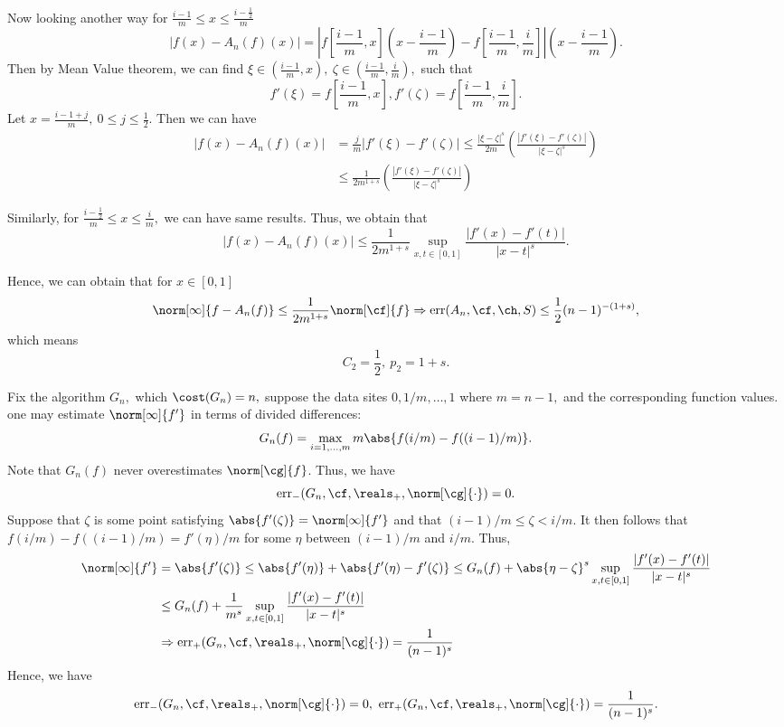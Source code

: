 Now looking another way for $\frac{i-1}{m} \leq x \leq \frac{i-\frac{1}{2}}{m}$
$$\left|f(x)-A_{n}(f)(x)\right|=\left|f\left[\frac{i-1}{m},x\right]\left(x-\frac{i-1}{m}\right)-f\left[\frac{i-1}{m},\frac{i}{m}\right]\right|\left(x-\frac{i-1}{m}\right).$$
Then by Mean Value theorem, we can find $\xi \in \left(\frac{i-1}{m},x\right), \ \zeta \in \left(\frac{i-1}{m},\frac{i}{m}\right),$ such that
$$f'(\xi)=f\left[\frac{i-1}{m},x\right],f'(\zeta)=f\left[\frac{i-1}{m},\frac{i}{m}\right].$$
Let $x=\frac{i-1+j}{m}, \ 0 \leq j \leq \frac{1}{2}.$ Then we can have
\begin{align*}
\left|f(x)-A_{n}(f)(x)\right|&=\frac{j}{m}|f'(\xi)-f'(\zeta)| \leq \frac{|\xi-\zeta|^{s}}{2m}\left(\frac{|f'(\xi)-f'(\zeta)|}{|\xi-\zeta|^{s}}\right)  \\
 & \leq \frac{1}{2m^{1+s}}\left(\frac{|f'(\xi)-f'(\zeta)|}{|\xi-\zeta|^{s}}\right)
\end{align*}

Similarly, for $\frac{i-\frac{1}{2}}{m} \leq x \leq \frac{i}{m},$ we can have same results.
Thus, we obtain that
$$\left|f(x)-A_{n}(f)(x)\right|\leq \frac{1}{2m^{1+s}}\sup\limits_{x,t \in [0,1]}\frac{|f'(x)-f'(t)|}{|x-t|^{s}}.$$

Hence, we can obtain that for $x \in [0,1]$
\begin{equation}\label{errorf}\norm[\infty]{f-A_{n}(f)} \leq  \frac{1}{2m^{1+s}}\norm[\cf]{f} \Rightarrow \err(A_n,\cf,\ch,S) \leq \frac{1}{2}(n-1)^{-(1+s)},
\end{equation}
which means $$C_{2}=\frac{1}{2} , \ p_{2}=1+s.$$


Fix the algorithm $G_n,$ which $\cost(G_n)=n,$
suppose the data sites $0, 1/m, \dots, 1$ where $m=n-1,$ and the corresponding function values. one may estimate $\norm[\infty]{f'}$ in terms of divided differences:
\begin{equation}
G_{n}(f)= \max_{i=1, \ldots, m} m\abs{f(i/m)-f((i-1)/m)}.
\end{equation}
Note that $G_n(f)$ never overestimates $\norm[\cg]{f}$. Thus, we have
$$\err_{-}(G_n,\cf,\reals_{+},\norm[\cg]{\cdot})=0.$$
 Suppose that $\zeta$ is some point satisfying $\abs{f'(\zeta)} = \norm[\infty]{f'}$ and
that $(i-1)/m \le \zeta < i/m$.  It then follows that $f(i/m)-f((i-1)/m) = f'(\eta)/m$ for some $\eta$ between $(i-1)/m$ and $i/m$.  Thus,
\begin{align*}
\norm[\infty]{f'} &= \abs{f'(\zeta)}\leq \abs{f'(\eta)} + \abs{f'(\eta)-f'(\zeta) }  \le G_{n}(f) + \abs{ \eta-\zeta}^{s}\sup\limits_{x,t \in [0,1]}\frac{|f'(x)-f'(t)|}{|x-t|^{s}}\nonumber\\
& \leq  G_n(f) + \frac{1}{m^{s}} \sup\limits_{x,t \in [0,1]}\frac{|f'(x)-f'(t)|}{|x-t|^{s}}\nonumber\\
&\Rightarrow \err_{+}(G_n,\cf,\reals_{+},\norm[\cg]{\cdot}) =\frac{1}{(n-1)^{s}}
\end{align*}
Hence, we have
$$\err_{-}(G_n,\cf,\reals_{+},\norm[\cg]{\cdot})=0, \ \err_{+}(G_n,\cf,\reals_{+},\norm[\cg]{\cdot}) =\frac{1}{(n-1)^{s}}.
$$

